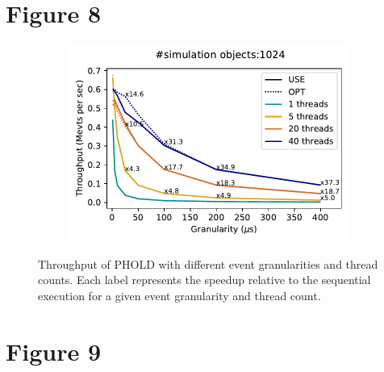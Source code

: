 \documentclass[]{article}
\begin{document}
\section*{Figure 8}
\renewcommand{\mysize}{0.25\linewidth}
\begin{figure}[!h]
\centering
\begin{subfigure}[b]{\mysize}
\centering
\includegraphics[width=\linewidth]{figures_original/figure7-v2.pdf}
\renewcommand{\thesubfigure}{Original}
\caption{}
\end{subfigure}
\hspace{1cm}
\begin{subfigure}[b]{\mysize}
\centering
{}
\renewcommand{\thesubfigure}{Reproduced}
\caption{}
\end{subfigure}
\caption{Throughput of PHOLD  with different event granularities and thread counts. Each label represents the speedup relative to the sequential execution for a given event granularity and thread count.}
\end{figure}

\clearpage


\section*{Figure 9}
\end{document}
